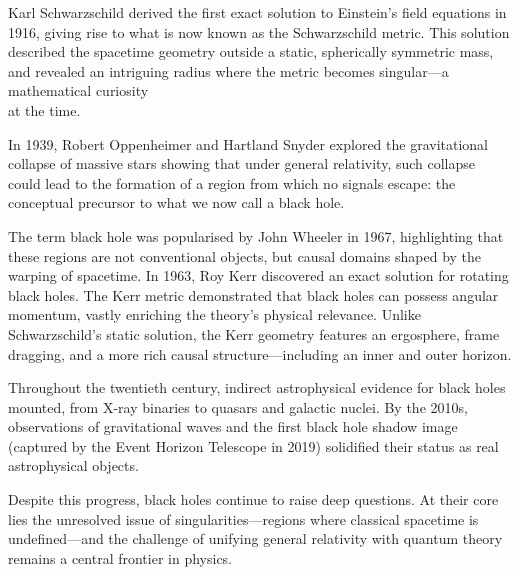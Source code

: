 \begin{historical}
Karl Schwarzschild derived the first exact solution to Einstein's field equations in 1916, giving rise to what is now known as the Schwarzschild metric. This solution described the spacetime geometry outside a static, spherically symmetric mass, and revealed an intriguing radius where the metric becomes singular—a mathematical curiosity \\ at the time.

In 1939, Robert Oppenheimer and Hartland Snyder explored the gravitational collapse of massive stars showing that under general relativity, such collapse could lead to the formation of a region from which no signals escape: the conceptual precursor to what we now call a black hole.

The term \QSOpen{}black hole\QSClose{} was popularised by John Wheeler in 1967, highlighting that these regions are not conventional objects, but causal domains shaped by the warping of spacetime. In 1963, Roy Kerr discovered an exact solution for rotating black holes. The Kerr metric demonstrated that black holes can possess angular momentum, vastly enriching the theory’s physical relevance. Unlike Schwarzschild’s static solution, the Kerr geometry features an ergosphere, frame dragging, and a more rich causal structure—including an inner and outer horizon.

Throughout the twentieth century, indirect astrophysical evidence for black holes mounted, from X-ray binaries to quasars and galactic nuclei. By the 2010s, observations of gravitational waves and the first black hole shadow image (captured by the Event Horizon Telescope in 2019) solidified their status as real astrophysical objects.

Despite this progress, black holes continue to raise deep questions. At their core lies the unresolved issue of singularities—regions where classical spacetime is undefined—and the challenge of unifying general relativity with quantum theory remains a central frontier in physics.
\end{historical}